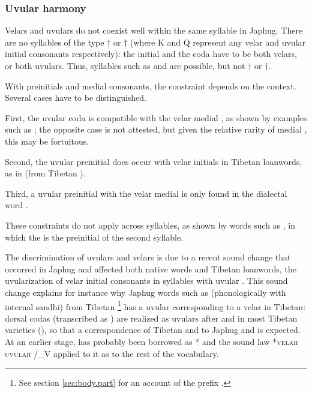 \subsubsection{Uvular harmony} \label{sec:uvular.harmony}
Velars and uvulars do not coexist well within the same syllable in Japhug. There are no syllables of the type $\dagger$ or $\dagger$ (where K and Q  represent any velar and uvular initial consonants respectively): the initial and the coda have to be both velars, or both uvulars. Thus, syllables such as  and  are possible, but not $\dagger$ or $\dagger$. 

With preinitials and medial consonants, the constraint depends on the context. Several cases have to be distinguished.

First, the uvular coda  is compatible with the velar medial , as shown by examples such as ; the opposite case is not attested, but given the relative rarity of medial , this may be fortuitous.

Second, the uvular preinitial   does occur with velar initials in Tibetan loanwords, as in  (from Tibetan ).

Third, a uvular preinitial with the velar medial  is only found in the dialectal word .

These constraints do not apply across syllables, as shown by words such as , in which the  is the preinitial of the second syllable.

The discrimination of uvulars and velars is due to a recent sound change that occurred in Japhug and affected both native words and Tibetan loanwords, the uvularization of velar initial consonants in syllables with uvular . This sound change explains for instance why Japhug words such as  (phonologically  with internal sandhi) from Tibetan \footnote{See section \ref{sec:body.part} for an account of the prefix .} has a uvular  corresponding to a velar  in Tibetan: dorsal codas (transcribed as ) are realized as uvulars after  and  in most Tibetan varieties (\citealt{gong16amdo}), so that a correspondence of Tibetan  and  to Japhug  and  is expected. At an earlier stage,  has probably been borrowed as * and the sound law *\textsc{velar} \fl{} \textsc{uvular} /\_V applied to it as to the rest of the vocabulary.
